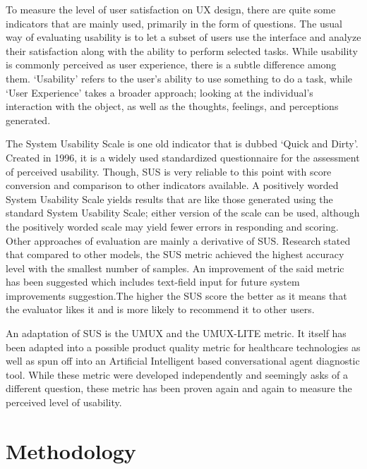 \documentclass[conference]{IEEEtran}
\begin{document}
To measure the level of user satisfaction on UX design, there are quite some indicators that are mainly used, primarily in the form of questions. The usual way of evaluating usability is to let a subset of users use the interface and analyze their satisfaction along with the ability to perform selected tasks\cite{Pastushenko}. While usability is commonly perceived as user experience, there is a subtle difference among them. `Usability' refers to the user's ability to use something to do a task, while `User Experience' takes a broader approach; looking at the individual's interaction with the object, as well as the thoughts, feelings, and perceptions generated\cite{Erlinda}.

The System Usability Scale is one old indicator that is dubbed `Quick and Dirty'\cite{Khalid}. Created in 1996, it is a widely used standardized questionnaire for the assessment of perceived usability\cite{JamesRLewis2018}. Though, SUS is very reliable to this point with score conversion and comparison to other indicators available\cite{Lewis2018MeasuringPU, Lewis2018ItemBF}. A positively worded System Usability Scale yields results that are like those generated using the standard System Usability Scale\cite{Kortum2021IsIT}; either version of the scale can be used, although the positively worded scale may yield fewer errors in responding and scoring\cite{Kortum2021IsIT}. Other approaches of evaluation are mainly a derivative of SUS\@. Research stated that compared to other models, the SUS metric achieved the highest accuracy level with the smallest number of samples\cite{Souza2019UserEE}. An improvement of the said metric has been suggested which includes text-field input for future system improvements suggestion\cite{Harper2021APS}.The higher the SUS score the better as it means that the evaluator likes it and is more likely to recommend it to other users\cite{Gramedia, Drew}.

An adaptation of SUS is the UMUX and the UMUX-LITE metric. It itself has been adapted into a possible product quality metric for healthcare technologies\cite{Borsci2019IsTL} as well as spun off into an Artificial Intelligent based conversational agent diagnostic tool\cite{Borsci2022TheCU}. While these metric were developed independently and seemingly asks of a different question, these metric has been proven again and again to measure the perceived level of usability\cite{Lewis2018MeasuringPU, Berkman2016ReassessingTU, Lewis2019MeasuringPU}.

\section{Methodology}
\end{document}

